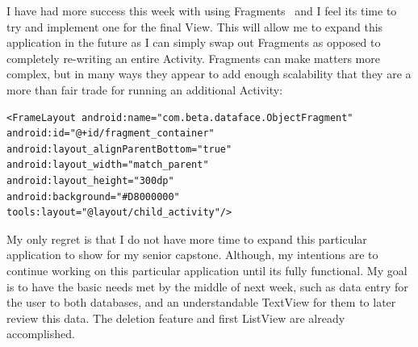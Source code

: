 \documentclass[fontsize=11pt, %
paper=a4, %
twoside, %
captions=tableheading,
index=totoc,
hyperref]{labbook}
\begin{document}
\begin{onehalfspace}
	I have had more success this week with using Fragments~\citep{fragments} and I feel its time to try and implement one for the final View. This will allow me to expand this application in the future as I can simply swap out Fragments as opposed to completely re-writing an entire Activity. Fragments can make matters more complex, but in many ways they appear to add enough scalability that they are a more than fair trade for running an additional Activity:
\end{onehalfspace}
\begin{verbatim}
<FrameLayout android:name="com.beta.dataface.ObjectFragment"
android:id="@+id/fragment_container"
android:layout_alignParentBottom="true"
android:layout_width="match_parent"
android:layout_height="300dp"
android:background="#D8000000"
tools:layout="@layout/child_activity"/>
\end{verbatim}
\begin{onehalfspace}
My only regret is that I do not have more time to expand this particular application to show for my senior capstone. Although, my intentions are to continue working on this particular application until its fully functional. My goal is to have the basic needs met by the middle of next week, such as data entry for the user to both databases, and an understandable TextView for them to later review this data. The deletion feature and first ListView are already accomplished.
\end{onehalfspace}
\clearpage
\printbibliography
\end{document}
